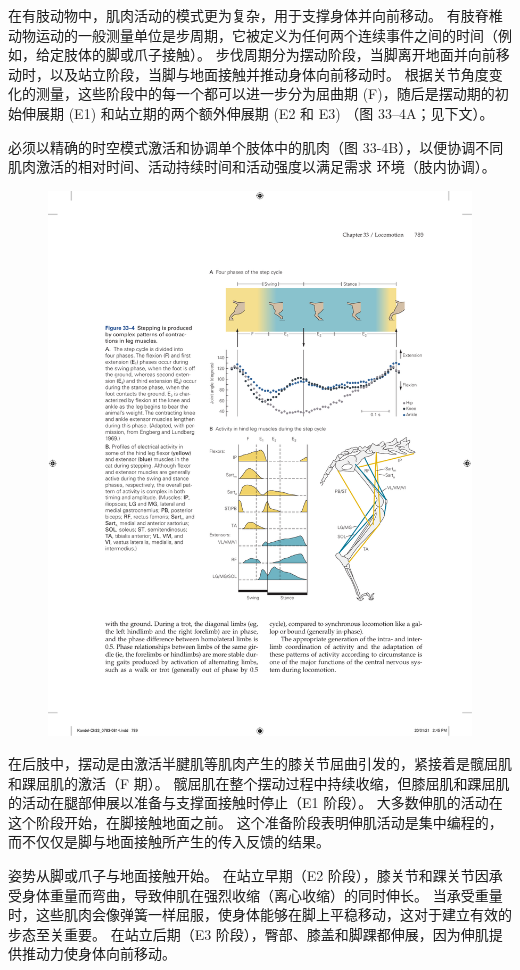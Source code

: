 在有肢动物中，肌肉活动的模式更为复杂，用于支撑身体并向前移动。 有肢脊椎动物运动的一般测量单位是步周期，它被定义为任何两个连续事件之间的时间（例如，给定肢体的脚或爪子接触）。 步伐周期分为摆动阶段，当脚离开地面并向前移动时，以及站立阶段，当脚与地面接触并推动身体向前移动时。 根据关节角度变化的测量，这些阶段中的每一个都可以进一步分为屈曲期 (F)，随后是摆动期的初始伸展期 (E1) 和站立期的两个额外伸展期 (E2 和 E3) （图 33–4A；见下文）。

必须以精确的时空模式激活和协调单个肢体中的肌肉（图 33-4B），以便协调不同肌肉激活的相对时间、活动持续时间和活动强度以满足需求 环境（肢内协调）。


\begin{figure}[htbp]
	\centering
	\includegraphics[width=0.65\linewidth]{chap33/fig_33_4}
	\caption{}
	\label{fig:33_4}
\end{figure}


在后肢中，摆动是由激活半腱肌等肌肉产生的膝关节屈曲引发的，紧接着是髋屈肌和踝屈肌的激活（F 期）。 髋屈肌在整个摆动过程中持续收缩，但膝屈肌和踝屈肌的活动在腿部伸展以准备与支撑面接触时停止（E1 阶段）。 大多数伸肌的活动在这个阶段开始，在脚接触地面之前。 这个准备阶段表明伸肌活动是集中编程的，而不仅仅是脚与地面接触所产生的传入反馈的结果。

姿势从脚或爪子与地面接触开始。 在站立早期（E2 阶段），膝关节和踝关节因承受身体重量而弯曲，导致伸肌在强烈收缩（离心收缩）的同时伸长。 当承受重量时，这些肌肉会像弹簧一样屈服，使身体能够在脚上平稳移动，这对于建立有效的步态至关重要。 在站立后期（E3 阶段），臀部、膝盖和脚踝都伸展，因为伸肌提供推动力使身体向前移动。

